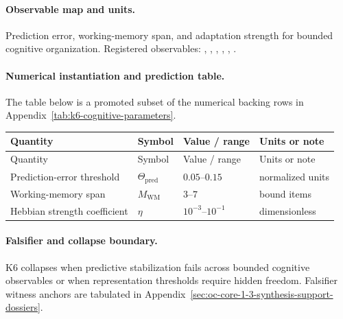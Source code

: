 \paragraph{Observable map and units.}
Prediction error, working-memory span, and adaptation strength for bounded cognitive organization.
Registered observables: , \allowbreak {}, \allowbreak {}, \allowbreak {}, \allowbreak {}, \allowbreak {}.

\paragraph{Numerical instantiation and prediction table.}
The table below is a promoted subset of the numerical backing rows in Appendix~\ref{tab:k6-cognitive-parameters}.
\begin{longtable}{@{}L{0.27\textwidth}L{0.15\textwidth}L{0.24\textwidth}L{0.16\textwidth}@{}}
\toprule
Quantity & Symbol & Value / range & Units or note \\
\midrule
\endfirsthead
\toprule
Quantity & Symbol & Value / range & Units or note \\
\midrule
\endhead
Prediction-error threshold & $\scriptstyle \Theta_{\mathrm{pred}}$ & $0.05\text{--}0.15$ & normalized units \\
Working-memory span & $\scriptstyle M_{\mathrm{WM}}$ & $3\text{--}7$ & bound items \\
Hebbian strength coefficient & $\scriptstyle \eta$ & $10^{-3}\text{--}10^{-1}$ & dimensionless \\
\bottomrule
\end{longtable}

\paragraph{Falsifier and collapse boundary.}
K6 collapses when predictive stabilization fails across bounded cognitive observables or when representation thresholds require hidden freedom.
Falsifier witness anchors are tabulated in Appendix~\ref{sec:oc-core-1-3-synthesis-support-dossiers}.

